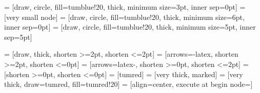 \usepackage{tikz}
\usepackage{pgfplots}
\pgfplotsset{compat=1.12}

\newcommand{\plotdatapath}{\figurepath/../../thesis/figures/data}
\newcommand{\includestandalonewithpath}[2][]{%
    \begingroup%
    \StrCount{#2}{/}[\matches]%
    \StrBefore[\matches]{#2}{/}[\figurepath]%
    \endgroup%
}


\usetikzlibrary{angles}
\usetikzlibrary{calc}
\usetikzlibrary{decorations}
\usetikzlibrary{positioning}
\usetikzlibrary{quotes}
\usetikzlibrary{shapes}
\usetikzlibrary{shapes.multipart}


 = [draw, circle, fill=tumblue!20, thick, minimum size=3pt, inner sep=0pt]
 = [very small node]
 = [draw, circle, fill=tumblue!20, thick, minimum size=6pt, inner sep=0pt]
 = [draw, circle, fill=tumblue!20, thick, minimum size=5pt, inner sep=5pt]

 = [draw, thick, shorten >=2pt, shorten <=2pt]
 = [arrows={-latex}, shorten >=2pt, shorten <=0pt]
 = [arrows={latex-}, shorten >=0pt, shorten <=2pt]
 = [shorten >=0pt, shorten <=0pt]
 = [tumred]
 = [very thick, marked]
 = [very thick, draw=tumred, fill=tumred!20]
 = [align=center, execute at begin node=\setlength{\baselineskip}{2ex}]




